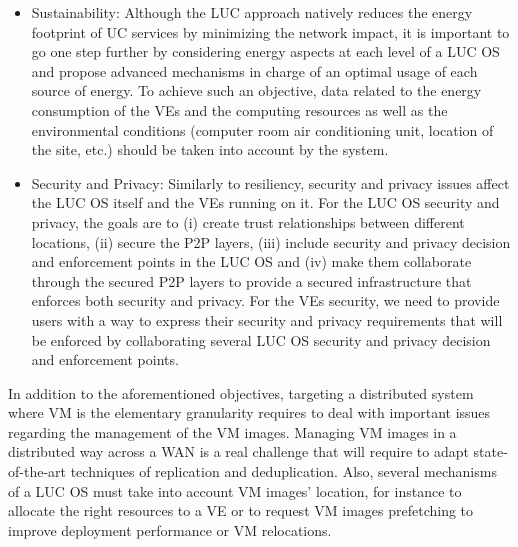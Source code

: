 \begin{itemize}
\item Sustainability: Although the LUC approach natively reduces the energy
footprint of UC services by minimizing the network impact, it is important to go one
step further by considering energy aspects at each level of a LUC OS
and propose advanced mechanisms in charge of an optimal usage of each source of energy. 
 To achieve such an objective, data related to the energy
  consumption of the VEs  and the computing resources
  as well as the environmental conditions (computer room air conditioning unit, location of the
  site, etc.) should be taken into account by the system.
\item Security and Privacy: Similarly to resiliency, security and privacy issues affect the LUC OS itself and the VEs running on it.
For the LUC OS security and privacy, the goals are to (i) create trust relationships between
different locations, (ii) secure the P2P layers, 
(iii) include security and privacy decision and enforcement points in the LUC OS and (iv) make them collaborate through the secured P2P layers to provide a secured infrastructure that enforces both security and privacy.
For the VEs security, we need to provide users with a way to express their security and privacy requirements that will be enforced by collaborating 
several LUC OS security and privacy decision and enforcement points.


\end{itemize}

In addition to the aforementioned objectives, targeting a distributed system
where VM is the elementary granularity requires to deal with important issues
regarding the management of the VM images. Managing VM images in a distributed
way across a WAN is a real challenge that will require to adapt
state-of-the-art techniques of replication and deduplication. Also,
several mechanisms of a LUC OS must take into account VM images'
location, for instance to allocate the right resources to a VE  or to request
VM images prefetching to improve deployment performance or VM relocations.

